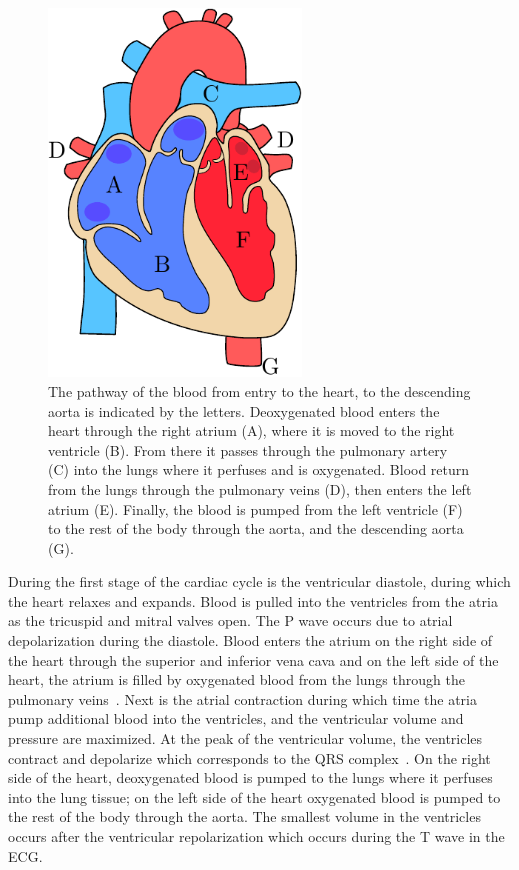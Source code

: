 \begin{figure}[H]
    \centering
    \includegraphics[width=0.6\textwidth]{chapter2-background/imgs/heart_drawing.pdf}
    \caption[Sketch of the anatomical heart]{ The pathway of the blood
    from entry to the heart, to the descending aorta is indicated by the
    letters. Deoxygenated blood enters the heart through the right atrium
    (A), where it is moved to the right ventricle (B). From there it passes through 
    the pulmonary artery (C) into the lungs where it perfuses and is oxygenated. 
    Blood return from the lungs through the pulmonary veins (D), then enters 
    the left atrium (E). Finally, the blood is pumped from the left
    ventricle (F) to the rest of the body through the aorta, and the
    descending aorta (G).}
    \label{fig:anatomical_heart}
\end{figure}

During the first stage of the cardiac cycle is the ventricular
diastole, during which the heart relaxes and 
expands. Blood is pulled into the ventricles 
from the atria as the tricuspid and mitral valves open.
The P wave occurs due to atrial depolarization during the diastole.
Blood enters the atrium 
on the right side of the heart through the
superior and inferior vena cava and on the left side of the heart, the atrium is 
filled by oxygenated blood from the lungs through the pulmonary 
veins~\parencite{pappano_cardiovascular_2019}.
Next is the atrial contraction during which time the atria pump additional
blood into the ventricles, and the ventricular volume and pressure 
are maximized. At the peak of the ventricular volume, the ventricles contract 
and depolarize which corresponds to the QRS complex~\parencite{pollock_physiology_2021}. 
On the right side of the heart, deoxygenated blood is pumped 
to the lungs where it perfuses into the lung tissue; on the left side of 
the heart oxygenated blood is pumped to the rest of the body through the 
aorta. The smallest volume in the ventricles occurs after 
the ventricular repolarization which occurs during the T wave in the ECG.

